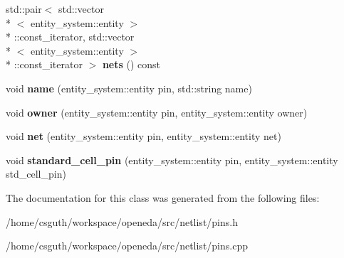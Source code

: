 \begin{DoxyCompactItemize}
\item 
\hypertarget{classophidian_1_1netlist_1_1pins_a4afd44f9b11c47aea194c5c535591b61}{std\-::pair$<$ std\-::vector\\*
$<$ entity\-\_\-system\-::entity $>$\\*
\-::const\-\_\-iterator, std\-::vector\\*
$<$ entity\-\_\-system\-::entity $>$\\*
\-::const\-\_\-iterator $>$ {\bfseries nets} () const }\label{classophidian_1_1netlist_1_1pins_a4afd44f9b11c47aea194c5c535591b61}

\item 
\hypertarget{classophidian_1_1netlist_1_1pins_a4132de5e6081568811b4c88f5ad8731e}{void {\bfseries name} (entity\-\_\-system\-::entity pin, std\-::string name)}\label{classophidian_1_1netlist_1_1pins_a4132de5e6081568811b4c88f5ad8731e}

\item 
\hypertarget{classophidian_1_1netlist_1_1pins_aa4b1fcac546abd775f778ba3645bfb9a}{void {\bfseries owner} (entity\-\_\-system\-::entity pin, entity\-\_\-system\-::entity owner)}\label{classophidian_1_1netlist_1_1pins_aa4b1fcac546abd775f778ba3645bfb9a}

\item 
\hypertarget{classophidian_1_1netlist_1_1pins_aeb20d5a910c8f158129d788c2960b616}{void {\bfseries net} (entity\-\_\-system\-::entity pin, entity\-\_\-system\-::entity net)}\label{classophidian_1_1netlist_1_1pins_aeb20d5a910c8f158129d788c2960b616}

\item 
\hypertarget{classophidian_1_1netlist_1_1pins_a936e2a8f453730c2244d3c5552248a75}{void {\bfseries standard\-\_\-cell\-\_\-pin} (entity\-\_\-system\-::entity pin, entity\-\_\-system\-::entity std\-\_\-cell\-\_\-pin)}\label{classophidian_1_1netlist_1_1pins_a936e2a8f453730c2244d3c5552248a75}

\end{DoxyCompactItemize}


The documentation for this class was generated from the following files\-:\begin{DoxyCompactItemize}
\item 
/home/csguth/workspace/openeda/src/netlist/pins.\-h\item 
/home/csguth/workspace/openeda/src/netlist/pins.\-cpp\end{DoxyCompactItemize}
